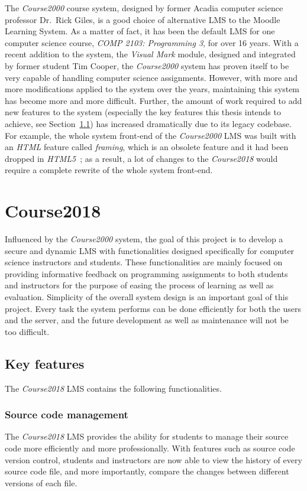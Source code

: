 The \emph{Course2000} course system, designed by former Acadia computer science
professor Dr.~Rick Giles, is a good choice
of alternative LMS to the Moodle Learning System.
As a matter of fact, it has been the
default LMS for one computer science course, \emph{COMP 2103: Programming 3},
for over 16 years.
With a recent addition to the system,
the \emph{Visual Mark} module,
designed and integrated by former student Tim Cooper,
the \emph{Course2000} system has proven itself
to be very capable of handling computer science assignments.
However, with more
and more modifications applied to the system over the years, maintaining
this system has become more and more difficult.
Further, the amount of work required to add new features to the
system (especially the key features this thesis intends to achieve,
see Section~\ref{FEATURES}) has increased dramatically
due to its legacy codebase.
For example, the whole system front-end of the \emph{Course2000} LMS was built
with an \emph{HTML} feature called \emph{framing}, which is an obsolete feature
and it had been dropped in \emph{HTML5}~\cite{framing};
as a result, a lot of changes to the \emph{Course2018} would require a complete
rewrite of the whole system front-end.

\section{Course2018}
Influenced by the \emph{Course2000} system, the goal of this project is to
develop a secure and dynamic LMS with functionalities designed specifically for
computer science instructors and students.
These functionalities are mainly focused on
providing informative feedback on programming assignments to both students
and instructors for the purpose of easing the process of learning as well as
evaluation.
Simplicity of the overall system design is an important goal of this project.
Every task the system 
performs can be done efficiently for both the users and the server,
and the future development as well as maintenance will not be too difficult.

\subsection{Key features}
\label{FEATURES}
The \emph{Course2018} LMS contains the following functionalities.

\subsubsection{Source code management}
The \emph{Course2018} LMS provides the ability for students to manage
their source code more efficiently and more professionally. With features such
as source code version control, students and instructors are now able
to view the history of every source code file, and more importantly, compare
the changes between different versions of each file.

